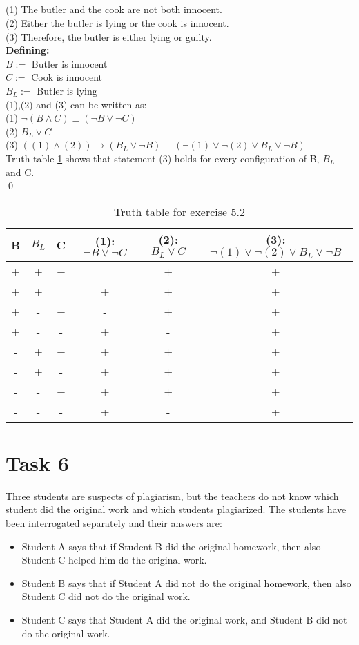\documentclass[paper=a4, fontsize=11pt]{scrartcl} %
\numberwithin{equation}{section} %
\numberwithin{figure}{section} %
\numberwithin{table}{section} %
\begin{document}
\subsection{}
(1) The butler and the cook are not both innocent.\\
(2) Either the butler is lying or the cook is innocent.\\
(3) Therefore, the butler is either lying or guilty.\\

\textbf{Defining:}\\
$B :=$ Butler is innocent\\
$C :=$ Cook is innocent\\
$B_L :=$ Butler is lying\\

(1),(2) and (3) can be written as:\\
(1) $\neg (B\land C)\equiv (\neg B\lor\neg C)$\\
(2) $B_L\lor C$\\
(3) $((1)\land (2))\to (B_L\lor\neg B)\equiv (\neg (1) \lor\neg (2)\lor B_L\lor \neg B)$\\

Truth table \ref{tab:ex5.2} shows that statement (3) holds for every configuration of B, $B_L$ and C.\\\qed


\begin{table}[h]
\begin{tabular}{|c|c|c|c|c|c|}
\hline
B&$B_L$&C&(1): $\neg B\lor\neg C$&(2): $B_L\lor C$&(3): $\neg (1) \lor\neg (2)\lor B_L\lor \neg B$\\
\hline
+&+&+&-&+&+\\
+&+&-&+&+&+\\
+&-&+&-&+&+\\
+&-&-&+&-&+\\
-&+&+&+&+&+\\
-&+&-&+&+&+\\
-&-&+&+&+&+\\
-&-&-&+&-&+\\

\hline
\end{tabular}
\caption{Truth table for exercise 5.2}
\label{tab:ex5.2}
\end{table}

\section{Task 6}
Three students are suspects of plagiarism, but the teachers do not know which student did
the original work and which students plagiarized. The students have been interrogated
separately and their answers are:
\begin{itemize}
\item Student A says that if Student B did the original homework, then also Student C
helped him do the original work.
\item Student B says that if Student A did not do the original homework, then also Student
C did not do the original work.
\item Student C says that Student A did the original work, and Student B did not do the
original work.
\end{itemize}
\end{document}
